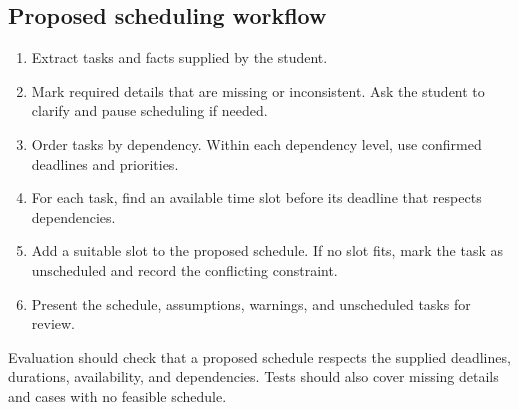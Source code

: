 \subsection*{Proposed scheduling workflow}
\begin{enumerate}
  \item Extract tasks and facts supplied by the student.
  \item Mark required details that are missing or inconsistent. Ask the student to clarify and pause scheduling if needed.
  \item Order tasks by dependency. Within each dependency level, use confirmed deadlines and priorities.
  \item For each task, find an available time slot before its deadline that respects dependencies.
  \item Add a suitable slot to the proposed schedule. If no slot fits, mark the task as unscheduled and record the conflicting constraint.
  \item Present the schedule, assumptions, warnings, and unscheduled tasks for review.
\end{enumerate}

Evaluation should check that a proposed schedule respects the supplied deadlines, durations, availability, and dependencies. Tests should also cover missing details and cases with no feasible schedule.
